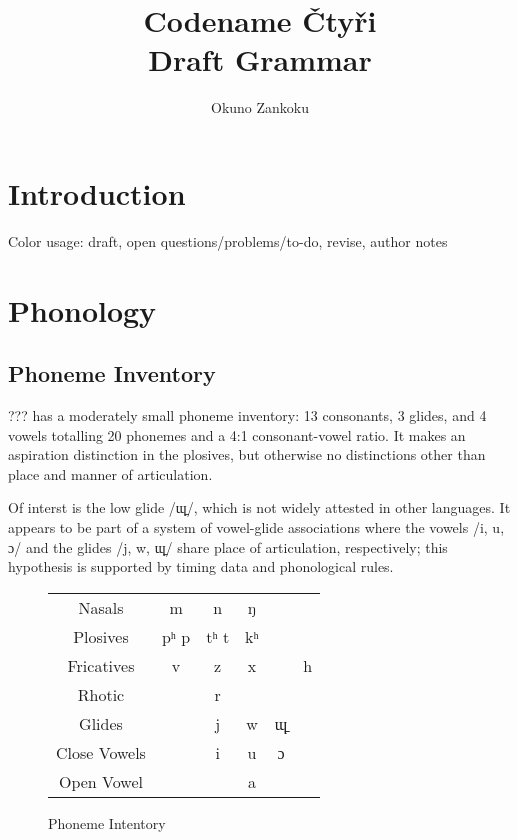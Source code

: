 \documentclass[12pt]{book} %
\title{Codename Čtyři \\ {\Large Draft Grammar}}
\author{Okuno Zankoku}
\begin{document}
\maketitle

\tableofcontents





\chapter{Introduction}

Color usage: {\color{orange}draft}, {\color{red}open questions/problems/to-do}, {\color{cyan}revise}, {\color{green} author notes}





\chapter{Phonology}

\section{Phoneme Inventory}
??? has a moderately small phoneme inventory: 13 consonants, 3 glides, and 4 vowels totalling 20 phonemes and a 4:1 consonant-vowel ratio.
It makes an aspiration distinction in the plosives, but otherwise no distinctions other than place and manner of articulation.

Of interst is the low glide /ɰ̠/, which is not widely attested in other languages.
It appears to be part of a system of vowel-glide associations where the vowels /i, u, ɔ/ and the glides /j, w, ɰ̠/ share place of articulation, respectively; this hypothesis is supported by timing data and phonological rules.

\begin{figure}[H]
\centering
	\begin{tabular}{cccccc}
	Nasals		&	m	& n		& ŋ 			\\
	Plosives		&	pʰ p	& tʰ t	& kʰ 		\\
	Fricatives	&	v	& z		& x	&	& h	\\
	Rhotic		&	  	& r					\\
	Glides		&	  	& j		& w	& ɰ̠		\\
	Close Vowels	&	  	& i		& u	& ɔ		\\
	Open Vowel	& 	  	&		& a	&		\\
	\end{tabular}
\caption{Phoneme Intentory}\label{t:phonemes}
\end{figure}
\end{document}
